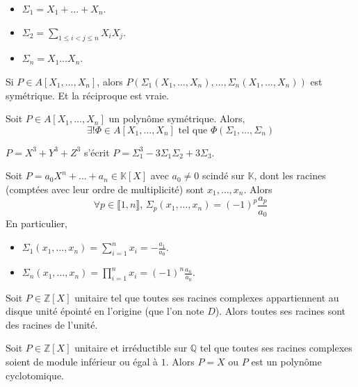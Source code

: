   \begin{example}
    \begin{itemize}
      \item $\Sigma_1 = X_1 + \dots + X_n$.
      \item $\Sigma_2 = \sum_{1 \leq i < j \leq n} X_i X_j$.
      \item $\Sigma_n = X_1 \dots X_n$.
    \end{itemize}
  \end{example}

  \begin{remark}
    Si $P \in A[X_1, \dots, X_n]$, alors $P(\Sigma_1(X_1, \dots, X_n), \dots, \Sigma_n(X_1, \dots, X_n))$ est symétrique. Et la réciproque est vraie.
  \end{remark}

  \begin{theorem}
    Soit $P \in A[X_1, \dots, X_n]$ un polynôme symétrique. Alors,
    \[ \exists! \Phi \in A[X_1, \dots, X_n] \text{ tel que } \Phi(\Sigma_1, \dots, \Sigma_n) \]
  \end{theorem}

  \begin{example}
    $P = X^3 + Y^3 + Z^3$ s'écrit $P = \Sigma_1^3 - 3 \Sigma_1 \Sigma_2 + 3 \Sigma_3$.
  \end{example}


  \begin{application}
    Soit $P = a_0X^n + \dots + a_n \in \mathbb{K}[X]$ avec $a_0 \neq 0$ scindé sur $\mathbb{K}$, dont les racines (comptées avec leur ordre de multiplicité) sont $x_1, \dots, x_n$. Alors
    \[ \forall p \in \llbracket 1, n \rrbracket, \, \Sigma_p(x_1, \dots, x_n) = (-1)^p \frac{a_p}{a_0} \]
    En particulier,
    \begin{itemize}
      \item $\Sigma_1(x_1, \dots, x_n) = \sum_{i=1}^n x_i = -\frac{a_1}{a_0}$.
      \item $\Sigma_n(x_1, \dots, x_n) = \prod_{i=1}^n x_i = (-1)^n \frac{a_n}{a_0}$.
    \end{itemize}
  \end{application}


  \begin{application}
    Soit $P \in \mathbb{Z}[X]$ unitaire tel que toutes ses racines complexes appartiennent au disque unité épointé en l'origine (que l'on note $D$). Alors toutes ses racines sont des racines de l'unité.
  \end{application}

  \begin{corollary}
    Soit $P \in \mathbb{Z}[X]$ unitaire et irréductible sur $\mathbb{Q}$ tel que toutes ses racines complexes soient de module inférieur ou égal à $1$. Alors $P = X$ ou $P$ est un polynôme cyclotomique.
  \end{corollary}

